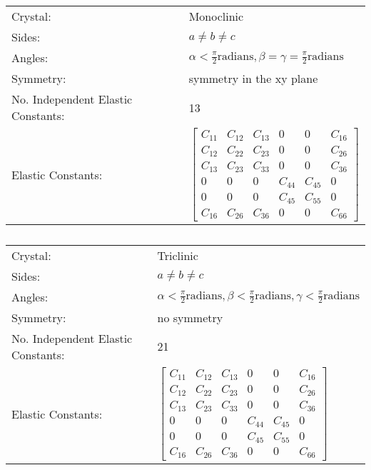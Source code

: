 \renewcommand{\arraystretch}{1.7}
\begin{table}[!htbp]
\begin{tabular}{ll}
Crystal: & Monoclinic \\
Sides: & $a \ne b \ne c$ \\
Angles: & $\alpha < \frac{\pi}{2} \text{radians},  \beta = \gamma = \frac{\pi}{2} \text{radians}$ \\
Symmetry: & symmetry in the xy plane \\
No. Independent Elastic Constants: & 13  \\
Elastic Constants: & $ \begin{bmatrix} C_{11} & C_{12} & C_{13} & 0 & 0 & C_{16} \\ C_{12} & C_{22} & C_{23} & 0 & 0 & C_{26} \\ C_{13} & C_{23} & C_{33} & 0 & 0 & C_{36} \\ 0 & 0 & 0 & C_{44} & C_{45} & 0 \\ 0 & 0 & 0 & C_{45} & C_{55} & 0 \\ C_{16} & C_{26} & C_{36} & 0 & 0 & C_{66} \end{bmatrix} $ \\
\end{tabular}
\label{tab:elasticmonoclinic}
\caption{}
\end{table}


\renewcommand{\arraystretch}{1.7}
\begin{table}[!htbp]
\begin{tabular}{ll}
Crystal: & Triclinic \\
Sides: & $a \ne b \ne c$ \\
Angles: & $ \alpha < \frac{\pi}{2} \text{radians}, \beta < \frac{\pi}{2} \text{radians}, \gamma < \frac{\pi}{2} \text{radians} $ \\
Symmetry: & no symmetry \\
No. Independent Elastic Constants: & 21  \\
Elastic Constants: & $ \begin{bmatrix} C_{11} & C_{12} & C_{13} & 0 & 0 & C_{16} \\ C_{12} & C_{22} & C_{23} & 0 & 0 & C_{26} \\ C_{13} & C_{23} & C_{33} & 0 & 0 & C_{36} \\ 0 & 0 & 0 & C_{44} & C_{45} & 0 \\ 0 & 0 & 0 & C_{45} & C_{55} & 0 \\ C_{16} & C_{26} & C_{36} & 0 & 0 & C_{66} \end{bmatrix} $ \\
\end{tabular}
\label{tab:elastictriclinic}
\caption{}
\end{table}


